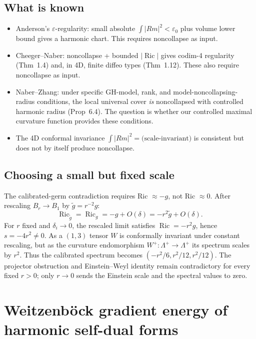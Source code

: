 \subsection{What is known}
\begin{itemize}
\item Anderson's $\varepsilon$-regularity: small absolute $\int|Rm|^2 < \varepsilon_0$
plus volume lower bound gives a harmonic chart. This requires noncollapse as input.
\item Cheeger--Naber: noncollapse + bounded $|\operatorname{Ric}|$ gives
codim-4 regularity (Thm~1.4) and, in 4D, finite diffeo types (Thm~1.12).
These also require noncollapse as input.
\item Naber--Zhang: under specific GH-model, rank, and model-noncollapsing-radius
conditions, the local universal cover \emph{is} noncollapsed with controlled
harmonic radius (Prop~6.4). The question is whether our controlled maximal
curvature function provides these conditions.
\item The 4D conformal invariance $\int|Rm|^2 = \text{(scale-invariant)}$
is consistent but does not by itself produce noncollapse.
\end{itemize}

\subsection{Choosing a small but fixed scale}
The calibrated-germ contradiction requires Ric $\approx -g$, not Ric $\approx 0$.
After rescaling $B_r \to B_1$ by $\tilde g = r^{-2}g$:
\[
\operatorname{Ric}_{\tilde g} = \operatorname{Ric}_g = -g + O(\delta) = -r^2\tilde g + O(\delta).
\]
For $r$ fixed and $\delta_i \to 0$, the rescaled limit satisfies
$\operatorname{Ric} = -r^2 g$, hence $s = -4r^2 \ne 0$.
As a $(1,3)$ tensor $W$ is conformally invariant under constant rescaling,
but as the curvature endomorphism $W^+:\Lambda^+\to\Lambda^+$ its spectrum
scales by $r^2$.  Thus the calibrated spectrum becomes
$(-r^2/6,r^2/12,r^2/12)$.  The projector obstruction and Einstein--Weyl
identity remain contradictory for every fixed $r>0$; only $r\to0$ sends the
Einstein scale and the spectral values to zero.

\section{Weitzenb\"ock gradient energy of harmonic self-dual forms}

